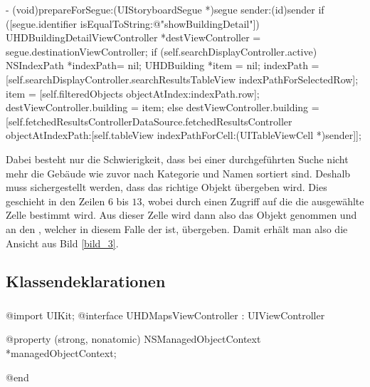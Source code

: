 \documentclass{report}
\begin{document}
\begin{objclst}
- (void)prepareForSegue:(UIStoryboardSegue *)segue sender:(id)sender
{
    if ([segue.identifier isEqualToString:@"showBuildingDetail"])
    {
        UHDBuildingDetailViewController *destViewController = segue.destinationViewController;
        if (self.searchDisplayController.active)
        {
            NSIndexPath *indexPath= nil;
            UHDBuilding *item = nil;
            indexPath = [self.searchDisplayController.searchResultsTableView indexPathForSelectedRow];
            item = [self.filteredObjects objectAtIndex:indexPath.row];
            destViewController.building = item;
        } else
        {
            destViewController.building = [self.fetchedResultsControllerDataSource.fetchedResultsController objectAtIndexPath:[self.tableView indexPathForCell:(UITableViewCell *)sender]];
        }
    }
}
\end{objclst}

Dabei besteht nur die Schwierigkeit, dass bei einer durchgeführten Suche nicht mehr die Gebäude wie zuvor nach Kategorie und Namen sortiert sind. Deshalb muss sichergestellt werden, dass das richtige Objekt übergeben wird. Dies geschieht in den Zeilen $6$ bis $13$, wobei durch einen Zugriff auf die  die ausgewählte Zelle bestimmt wird. Aus dieser Zelle wird dann also das Objekt genommen und an den , welcher in diesem Falle der  ist, übergeben. Damit erhält man also die Ansicht aus Bild \ref{bild_3}.

\newpage

\subsection{Klassendeklarationen}

\vspace{0,5cm}

\subsubsection{}

\begin{objclst}
@import UIKit;
@interface UHDMapsViewController : UIViewController

@property (strong, nonatomic) NSManagedObjectContext *managedObjectContext;

@end
\end{objclst}
\end{document}
